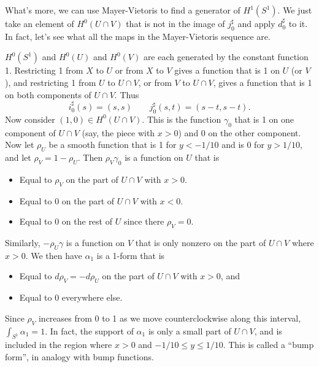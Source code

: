 \documentclass[12pt]{amsbook}
\theoremstyle{definition}
\begin{document}
What's more, we can use Mayer-Vietoris to find a generator of $H^1(S^1)$. We just take an element of $H^0(U\cap V)$
that is not in the image of $j_0^\sharp$ and apply $d_0^\sharp$ to it.   In fact, let's see what all the maps in the Mayer-Vietoris
sequence are.

$H^0(S^1)$ and $H^0(U)$ and $H^0(V)$ are each generated by the constant function 1. Restricting 1 from $X$ to $U$ or from 
$X$ to $V$ gives a function that is 1 on $U$ (or $V$), and restricting 1 from $U$ to $U\cap V$, or from $V$ to $U \cap V$, gives a function that is 1 on both components of $U \cap V$. Thus 
$$i_0^\sharp(s)  = (s,s) \qquad j_0^\sharp(s,t)  =  (s-t, s-t).$$
Now consider $(1,0) \in H^0(U \cap V)$. This is the function $\gamma_0$ that is 1 on one 
component of $U\cap V$ (say, the piece with
$x>0$) and 0 on the other component. Now let $\rho_U$ be a smooth function that is 1 for $y<-1/10$ and is 0 for $y>1/10$, and 
let $\rho_V = 1-\rho_U$. Then $\rho_V \gamma_0$ is a function on $U$ that is 
\begin{itemize}
\item Equal to $\rho_V$ on the part of $U \cap V$ with $x>0$. 
\item Equal to 0 on the part of $U \cap V$ with $x < 0$. 
\item Equal to 0 on the rest of $U$ since there $\rho_V=0$.
\end{itemize}
Similarly, $-\rho_U \gamma$ is a function on $V$ that is only nonzero on the part of $U\cap V$ where $x>0$.  We then
have $\alpha_1$ is a 1-form that is 
\begin{itemize}
\item Equal to $d\rho_V = -d\rho_U$ on the part of $U \cap V$ with $x>0$, and 
\item Equal to $0$ everywhere else. 
\end{itemize}
Since $\rho_V$ increases from 0 to 1 as we move counterclockwise along this interval, $\int_{S^1} \alpha_1 = 1$.  
In fact, the support of 
$\alpha_1$ is only a small part of $U\cap V$, and is included in the region where $x>0$ and $-1/10 \le y \le 1/10$. This is  
called a ``bump form'', in analogy with bump functions. 
\end{document}
